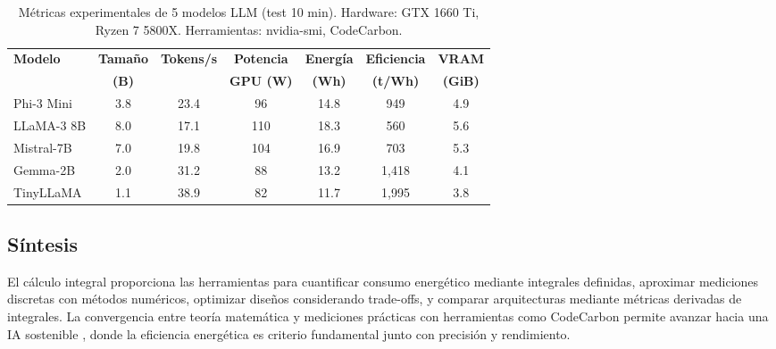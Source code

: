 \begin{table}[h]
\centering
\begin{tabular}{lcccccc}
\hline
\textbf{Modelo} & \textbf{Tamaño} & \textbf{Tokens/s} & \textbf{Potencia} & \textbf{Energía} & \textbf{Eficiencia} & \textbf{VRAM} \\
 & \textbf{(B)} & & \textbf{GPU (W)} & \textbf{(Wh)} & \textbf{(t/Wh)} & \textbf{(GiB)} \\
\hline
Phi-3 Mini & 3.8 & 23.4 & 96 & 14.8 & 949 & 4.9 \\
LLaMA-3 8B & 8.0 & 17.1 & 110 & 18.3 & 560 & 5.6 \\
Mistral-7B & 7.0 & 19.8 & 104 & 16.9 & 703 & 5.3 \\
Gemma-2B & 2.0 & 31.2 & 88 & 13.2 & 1,418 & 4.1 \\
TinyLLaMA & 1.1 & 38.9 & 82 & 11.7 & 1,995 & 3.8 \\
\hline
\end{tabular}
\caption{Métricas experimentales de 5 modelos LLM (test 10 min). Hardware: GTX 1660 Ti, Ryzen 7 5800X. Herramientas: nvidia-smi, CodeCarbon.}
\label{tab:metricas_experimentales}
\end{table}

\subsection{Síntesis}

El cálculo integral proporciona las herramientas para cuantificar consumo energético mediante integrales definidas, aproximar mediciones discretas con métodos numéricos, optimizar diseños considerando trade-offs, y comparar arquitecturas mediante métricas derivadas de integrales. La convergencia entre teoría matemática y mediciones prácticas con herramientas como CodeCarbon permite avanzar hacia una IA sostenible \cite{tabbakh2024sustainable}, donde la eficiencia energética es criterio fundamental junto con precisión y rendimiento.

